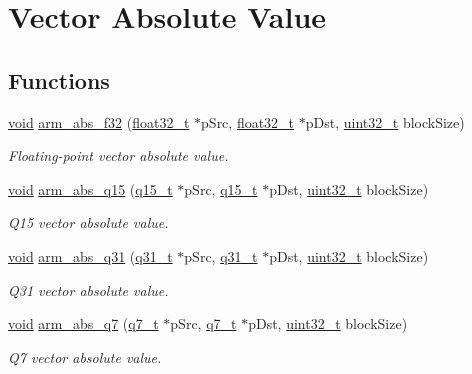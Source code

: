 \hypertarget{group___basic_abs}{\section{Vector Absolute Value}
\label{group___basic_abs}
}
\subsection*{Functions}
\begin{DoxyCompactItemize}
\item 
\hyperlink{group___n_a_m_e_ga18028b8badbf1ea7e704ccac3c488e82}{void} \hyperlink{group___basic_abs_ga421b6275f9d35f50286c0ff3beceff02}{arm\-\_\-abs\-\_\-f32} (\hyperlink{arm__math_8h_a4611b605e45ab401f02cab15c5e38715}{float32\-\_\-t} $\ast$p\-Src, \hyperlink{arm__math_8h_a4611b605e45ab401f02cab15c5e38715}{float32\-\_\-t} $\ast$p\-Dst, \hyperlink{stdint_8h_a435d1572bf3f880d55459d9805097f62}{uint32\-\_\-t} block\-Size)
\begin{DoxyCompactList}\small\item\em Floating-\/point vector absolute value. \end{DoxyCompactList}\item 
\hyperlink{group___n_a_m_e_ga18028b8badbf1ea7e704ccac3c488e82}{void} \hyperlink{group___basic_abs_ga39f92964c9b649ba252e26ebe7b95594}{arm\-\_\-abs\-\_\-q15} (\hyperlink{arm__math_8h_ab5a8fb21a5b3b983d5f54f31614052ea}{q15\-\_\-t} $\ast$p\-Src, \hyperlink{arm__math_8h_ab5a8fb21a5b3b983d5f54f31614052ea}{q15\-\_\-t} $\ast$p\-Dst, \hyperlink{stdint_8h_a435d1572bf3f880d55459d9805097f62}{uint32\-\_\-t} block\-Size)
\begin{DoxyCompactList}\small\item\em Q15 vector absolute value. \end{DoxyCompactList}\item 
\hyperlink{group___n_a_m_e_ga18028b8badbf1ea7e704ccac3c488e82}{void} \hyperlink{group___basic_abs_ga59eafcdcdb52da60d37f20aec6ff4577}{arm\-\_\-abs\-\_\-q31} (\hyperlink{arm__math_8h_adc89a3547f5324b7b3b95adec3806bc0}{q31\-\_\-t} $\ast$p\-Src, \hyperlink{arm__math_8h_adc89a3547f5324b7b3b95adec3806bc0}{q31\-\_\-t} $\ast$p\-Dst, \hyperlink{stdint_8h_a435d1572bf3f880d55459d9805097f62}{uint32\-\_\-t} block\-Size)
\begin{DoxyCompactList}\small\item\em Q31 vector absolute value. \end{DoxyCompactList}\item 
\hyperlink{group___n_a_m_e_ga18028b8badbf1ea7e704ccac3c488e82}{void} \hyperlink{group___basic_abs_gadc30985e33fbf96802a5a7954dece3b1}{arm\-\_\-abs\-\_\-q7} (\hyperlink{arm__math_8h_ae541b6f232c305361e9b416fc9eed263}{q7\-\_\-t} $\ast$p\-Src, \hyperlink{arm__math_8h_ae541b6f232c305361e9b416fc9eed263}{q7\-\_\-t} $\ast$p\-Dst, \hyperlink{stdint_8h_a435d1572bf3f880d55459d9805097f62}{uint32\-\_\-t} block\-Size)
\begin{DoxyCompactList}\small\item\em Q7 vector absolute value. \end{DoxyCompactList}\end{DoxyCompactItemize}


